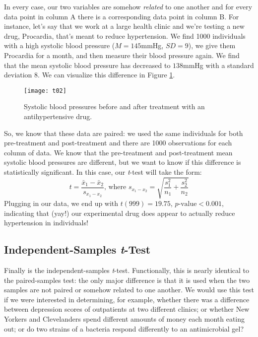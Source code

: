 In every case, our two variables are somehow \textit{related} to one another and for every data point in column A there is a corresponding data point in column B. For instance, let's say that we work at a large health clinic and we're testing a new drug, Procardia, that's meant to reduce hypertension. We find 1000 individuals with a high systolic blood pressure ($M=145$mmHg, $SD=9$), we give them Procardia for a month, and then measure their blood pressure again. We find that the mean systolic blood pressure has decreased to $138$mmHg with a standard deviation $8$. We can visualize this difference in Figure \ref{fig:t02}.

\begin{figure}[htp]
\texttt{[image: t02]}
\caption{Systolic blood pressures before and after treatment with an antihypertensive drug.}
\label{fig:t02}
\end{figure}

So, we know that these data are paired: we used the same individuals for both pre-treatment and post-treatment and there are 1000 observations for each column of data. We know that the pre-treatment and post-treatment mean systolic blood pressures are different, but we want to know if this difference is statistically significant. In this case, our \textit{t}-test will take the form:
\begin{equation}
t=\frac{\bar{x}_1-\bar{x}_2}{s_{x_1-x_2}}\text{, where }s_{x_1-x_2}=\sqrt{\frac{s_1^2}{n_1}+\frac{s_2^2}{n_2}}
\end{equation}
Plugging in our data, we end up with $t(999)=19.75$, $p\text{-value}<0.001$, indicating that (yay!) our experimental drug does appear to actually reduce hypertension in individuals!

\subsection{Independent-Samples \textit{t}-Test}

Finally is the independent-samples \textit{t}-test. Functionally, this is nearly identical to the paired-samples test: the only major difference is that it is used when the two samples are not paired or somehow related to one another. We would use this test if we were interested in determining, for example, whether there was a difference between depression scores of outpatients at two different clinics; or whether New Yorkers and Clevelanders spend different amounts of money each month eating out; or do two strains of a bacteria respond differently to an antimicrobial gel?

